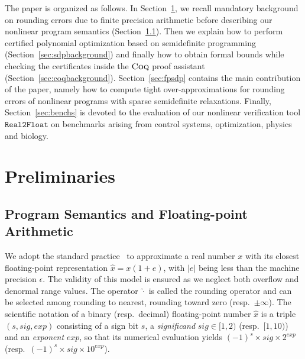 \documentclass[preprint]{sigplanconf}
\newcommand{\realtofloat}{\mathtt{Real2Float}}
\newcommand{\coq}{\text{\sc Coq}}
\theoremstyle{plain}
\begin{document}
The paper is organized as follows.
%
In Section~\ref{sec:background}, we recall mandatory background on rounding errors due to finite precision arithmetic before describing our nonlinear program semantics (Section~\ref{sec:fpbackground}). Then we explain how to perform certified polynomial optimization based on semidefinite programming (Section~\ref{sec:sdpbackground}) and finally how to obtain formal bounds while checking the certificates inside the $\coq$ proof assistant (Section~\ref{sec:coqbackground}).
%
Section~\ref{sec:fpsdp} contains the main contribution of the paper, namely how to compute tight over-approximations for rounding errors of nonlinear programs with sparse semidefinite relaxations.
%
Finally, Section~\ref{sec:benchs} is devoted to the evaluation of our nonlinear verification tool $\realtofloat$ on benchmarks arising from control systems, optimization, physics and biology.

\section{Preliminaries}
\label{sec:background}

\subsection{Program Semantics and Floating-point Arithmetic}
\label{sec:fpbackground}
We adopt the standard practice~\cite{higham2002accuracy} to approximate a real number $x$ with its closest floating-point representation $\hat{x} = x (1 + e)$, with $|e|$ being less than the machine precision $\epsilon$. The validity of this model is ensured as we neglect both overflow and denormal range values.
The operator $\hat{\cdot}$ is called the rounding operator and can be selected among rounding to nearest, rounding toward zero (resp.~$\pm\infty$).
The scientific notation of a binary (resp.~decimal) floating-point number $\hat{x}$ is a triple $(s, sig, exp)$ consisting of a sign bit $s$, a {\em significand} $sig \in [1, 2)$ (resp.~$[1, 10)$) and an {\em exponent} $exp$, so that its numerical evaluation yields $(-1)^{s} \times sig \times 2^{exp}$ (resp.~$(-1)^{s} \times sig \times 10^{exp}$). 
\end{document}
